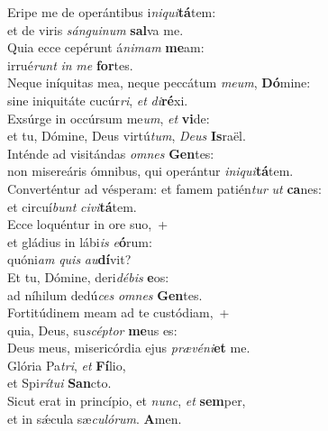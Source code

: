 \evenverse Eripe me de operántibus i\textit{ni}\textit{qui}\textbf{tá}tem:~\*\\
\evenverse et de viris \textit{sán}\textit{gui}\textit{num} \textbf{sal}va me.\\
\oddverse Quia ecce cepérunt á\textit{ni}\textit{mam} \textbf{me}am:~\*\\
\oddverse irrué\textit{runt} \textit{in} \textit{me} \textbf{for}tes.\\
\evenverse Neque iníquitas mea, neque peccátum \textit{me}\textit{um}, \textbf{Dó}mine:~\*\\
\evenverse sine iniquitáte cucúr\textit{ri}, \textit{et} \textit{di}\textbf{ré}xi.\\
\oddverse Exsúrge in occúrsum me\textit{um}, \textit{et} \textbf{vi}de:~\*\\
\oddverse et tu, Dómine, Deus virtú\textit{tum}, \textit{De}\textit{us} \textbf{Is}raël.\\
\evenverse Inténde ad visitándas \textit{om}\textit{nes} \textbf{Gen}tes:~\*\\
\evenverse non misereáris ómnibus, qui operántur \textit{i}\textit{ni}\textit{qui}\textbf{tá}tem.\\
\oddverse Converténtur ad vésperam: et famem patién\textit{tur} \textit{ut} \textbf{ca}nes:~\*\\
\oddverse et circuí\textit{bunt} \textit{ci}\textit{vi}\textbf{tá}tem.\\
\evenverse Ecce loquéntur in ore suo,~+\\
\evenverse  et gládius in lábi\textit{is} \textit{e}\textbf{ó}rum:~\*\\
\evenverse quóni\textit{am} \textit{quis} \textit{au}\textbf{dí}vit?\\
\oddverse Et tu, Dómine, deri\textit{dé}\textit{bis} \textbf{e}os:~\*\\
\oddverse ad níhilum dedú\textit{ces} \textit{om}\textit{nes} \textbf{Gen}tes.\\
\evenverse Fortitúdinem meam ad te custódiam,~+\\
\evenverse  quia, Deus, su\textit{scép}\textit{tor} \textbf{me}us es:~\*\\
\evenverse Deus meus, misericórdia ejus \textit{præ}\textit{vé}\textit{ni}\textbf{et} me.\\
\oddverse Glória Pa\textit{tri}, \textit{et} \textbf{Fí}lio,~\*\\
\oddverse et Spi\textit{rí}\textit{tu}\textit{i} \textbf{San}cto.\\
\evenverse Sicut erat in princípio, et \textit{nunc}, \textit{et} \textbf{sem}per,~\*\\
\evenverse et in sǽcula sæ\textit{cu}\textit{ló}\textit{rum}. \textbf{A}men.\\
